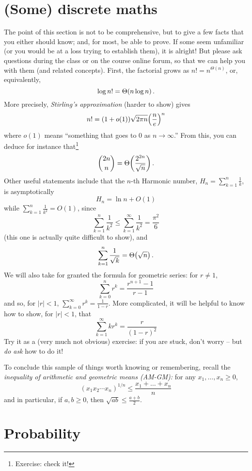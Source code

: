 \section{(Some) discrete maths}
The point of this section is not to be comprehensive, but to give a few facts that you either should know; and, for most, be able to prove. If some seem unfamiliar (or you would be at a loss trying to establish them), it is alright! But please ask questions during the class or on the course online forum, so that we can help you with them (and related concepts).
First, the factorial grows as $n! = n^{\Theta(n)}$, or, equivalently,
\[
\log n! = \bigTheta{n\log n}\,.
\]
More precisely, \emph{Stirling's approximation} (harder to show) gives
\[
    n! = (1+o(1))\sqrt{2\pi n } \mleft(\frac{n}{e}\mright)^n
\]
where $o(1)$ means ``something that goes to $0$ as $n\to \infty$.'' From this, you can deduce for instance that\footnote{Exercise: check it!}
\[
    \binom{2n}{n} = \bigTheta{\frac{2^{2n}}{\sqrt{n}}}\,.
\]
Other useful statements include that the $n$-th Harmonic number, $H_n = \sum_{k=1}^n \frac{1}{k}$, is asymptotically
\[
    H_n = \ln n + O(1)
\]
while $\sum_{k=1}^n \frac{1}{k^2} = O(1)$, since
\[
    \sum_{k=1}^n \frac{1}{k^2} \leq \sum_{k=1}^\infty \frac{1}{k^2} = \frac{\pi^2}{6}
\]
(this one is actually quite difficult to show), and
\[
    \sum_{k=1}^n \frac{1}{\sqrt{k}}  = \bigTheta{\sqrt{n}}\,.
\]
We will also take for granted the formula for geometric series: for $r\neq 1$,
\[
\sum_{k=0}^n r^k = \frac{r^{n+1}-1}{r-1}
\]
and so, for $|r|<1$, $\sum_{k=0}^\infty r^k = \frac{1}{1-r}$. More complicated, it will be helpful to know how to show, for $|r|<1$, that
\[
\sum_{k=1}^\infty k r^k = \frac{r}{(1-r)^2}
\]
Try it as a (very much not obvious) exercise: if you are stuck, don't worry -- but \emph{do ask} how to do it!

To conclude this sample of things worth knowing or remembering, recall the \emph{inequality of arithmetic and geometric means (AM-GM):} for any $x_1,\dots, x_n \geq 0$,
\[
(x_1 x_2\cdots x_n)^{1/n} \leq \frac{x_1+\dots + x_n}{n}
\]
and in particular, if $a,b\geq 0$, then $\sqrt{ab} \leq \frac{a+b}{2}$.

\section{Probability}

